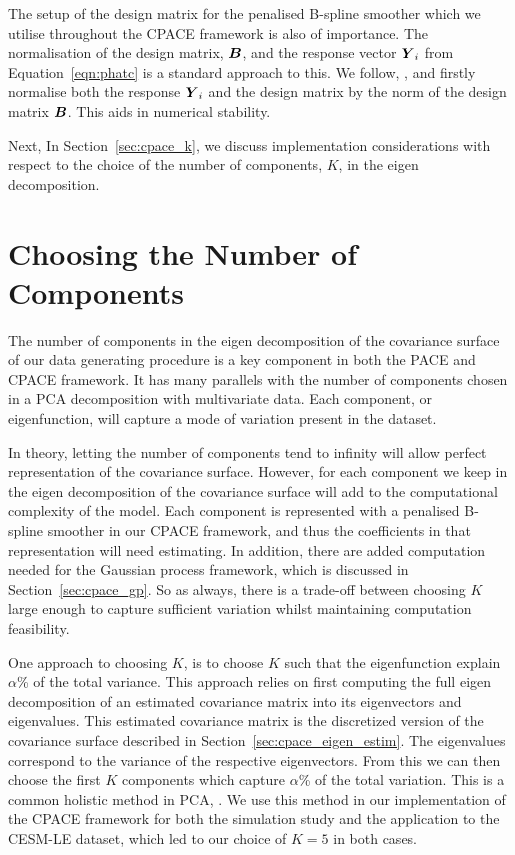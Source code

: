 The setup of the design matrix for the penalised B-spline smoother which we utilise throughout the CPACE framework is also of importance.
The normalisation of the design matrix, $\bm{{B}}$, and the response vector $\bm{{Y}}_{i}$ from Equation~\ref{eqn:phatc} is a standard approach to this.
We follow, \citep{wood_generalized_2006}, and firstly normalise both the response $\bm{{Y}}_{i}$ and the design matrix by the norm of the design matrix $\bm{{B}}$.
This aids in numerical stability. 

Next, In Section~\ref{sec:cpace_k}, we discuss implementation considerations with respect to the choice of the number of components, $K$, in the eigen decomposition.

\section{Choosing the Number of Components \label{sec:cpace_k}}
The number of components in the eigen decomposition of the covariance surface of our data generating procedure is a key component in both the PACE and CPACE framework.
It has many parallels with the number of components chosen in a PCA decomposition with multivariate data. 
Each component, or eigenfunction, will capture a mode of variation present in the dataset.

In theory, letting the number of components tend to infinity will allow perfect representation of the covariance surface.
However, for each component we keep in the eigen decomposition of the covariance surface will add to the computational complexity of the model.
Each component is represented with a penalised B-spline smoother in our CPACE framework, and thus the coefficients in that representation will need estimating. 
In addition, there are added computation needed for the Gaussian process framework, which is discussed in Section~\ref{sec:cpace_gp}.
So as always, there is a trade-off between choosing $K$ large enough to capture sufficient variation whilst maintaining computation feasibility.

One approach to choosing $K$, is to choose $K$ such that the eigenfunction explain $\alpha$\% of the total variance.
This approach relies on first computing the full eigen decomposition of an estimated covariance matrix into its eigenvectors and eigenvalues.
This estimated covariance matrix is the discretized version of the covariance surface described in Section~\ref{sec:cpace_eigen_estim}.
The eigenvalues correspond to the variance of the respective eigenvectors.
From this we can then choose the first $K$ components which capture $\alpha$\% of the total variation. 
This is a common holistic method in PCA, \citep{jolliffe_choosing_2002}.
We use this method in our implementation of the CPACE framework for both the simulation study and the application to the CESM-LE dataset, which led to our choice of $K=5$ in both cases.


